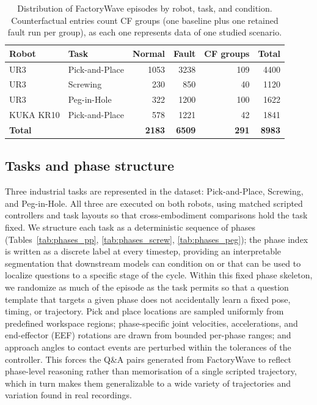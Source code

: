 \documentclass{article}
\begin{document}
\begin{table}[htbp]
    \centering
    \caption{Distribution of FactoryWave episodes by robot, task, and condition. Counterfactual entries count CF groups (one baseline plus one retained fault run per group), as each one represents data of one studied scenario.}
    \label{tab:factorywave_distribution}
    \small
    \begin{tabular}{@{}llrrrr@{}}
        \toprule
        Robot          & Task           & Normal        & Fault         & CF groups    & Total         \\
        \midrule
        UR3            & Pick-and-Place & 1053          & 3238          & 109          & 4400          \\
        UR3            & Screwing       & 230           & 850           & 40           & 1120          \\
        UR3            & Peg-in-Hole    & 322           & 1200          & 100          & 1622          \\
        KUKA KR10      & Pick-and-Place & 578           & 1221          & 42           & 1841          \\
        \midrule
        \textbf{Total} &                & \textbf{2183} & \textbf{6509} & \textbf{291} & \textbf{8983} \\
        \bottomrule
    \end{tabular}
\end{table}

\subsection{Tasks and phase structure}

Three industrial tasks are represented in the dataset: Pick-and-Place, Screwing, and Peg-in-Hole. All three are executed on both robots, using matched scripted controllers and task layouts so that cross-embodiment comparisons hold the task fixed. We structure each task as a deterministic sequence of phases (Tables~\ref{tab:phases_pp}, \ref{tab:phases_screw}, \ref{tab:phases_peg}); the phase index is written as a discrete label at every timestep, providing an interpretable segmentation that downstream models can condition on or that can be used to localize questions to a specific stage of the cycle. Within this fixed phase skeleton, we randomize as much of the episode as the task permits so that a question template that targets a given phase does not accidentally learn a fixed pose, timing, or trajectory. Pick and place locations are sampled uniformly from predefined workspace regions; phase-specific joint velocities, accelerations, and end-effector (EEF) rotations are drawn from bounded per-phase ranges; and approach angles to contact events are perturbed within the tolerances of the controller. This forces the Q\&A pairs generated from FactoryWave to reflect phase-level reasoning rather than memorisation of a single scripted trajectory, which in turn makes them generalizable to a wide variety of trajectories and variation found in real recordings.
\end{document}
